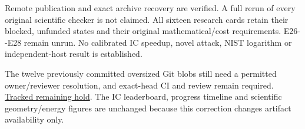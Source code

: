 \documentclass[
  10pt,
]{article}
\begin{document}
Remote publication and exact archive recovery are verified. A full rerun
of every original scientific checker is not claimed. All sixteen
research cards retain their blocked, unfunded states and their original
mathematical/cost requirements. E26-\/-E28 remain unrun. No calibrated
IC speedup, novel attack, NIST logarithm or independent-host result is
established.

The twelve previously committed oversized Git blobs still need a
permitted owner/reviewer resolution, and exact-head CI and review remain
required.
\href{../../../../problems/twist-followup-evidence-publication.md}{Tracked
remaining hold}. The IC leaderboard, progress timeline and scientific
geometry/energy figures are unchanged because this correction changes
artifact availability only.
\end{document}
